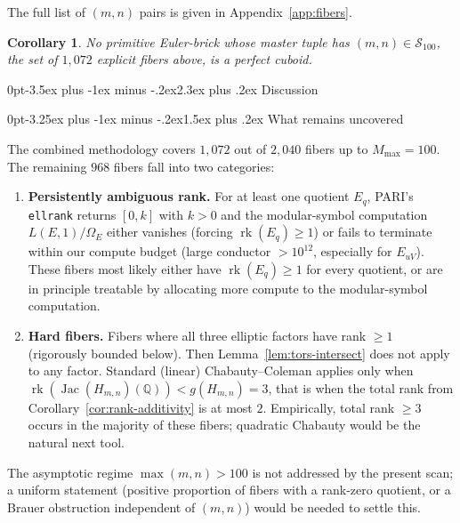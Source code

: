\documentclass[12pt,a4paper,reqno]{amsart}
\makeatletter
\renewcommand{\section}{\@startsection{section}{1}%
  {0pt}{-3.5ex plus -1ex minus -.2ex}{2.3ex plus .2ex}%
  {\normalfont\large\bfseries}}
\renewcommand{\subsection}{\@startsection{subsection}{2}%
  {0pt}{-3.25ex plus -1ex minus -.2ex}{1.5ex plus .2ex}%
  {\normalfont\normalsize\bfseries}}
\theoremstyle{plain}
\newtheorem{corollary}[theorem]{Corollary}
\theoremstyle{definition}
\theoremstyle{remark}
\newcommand{\Q}{\mathbb{Q}}
\newcommand{\HC}{H_{m,n}}
\newcommand{\Jac}{\operatorname{Jac}}
\newcommand{\rk}{\operatorname{rk}}
\makeatother
\begin{document}
The full list of $(m, n)$ pairs is given in Appendix~\ref{app:fibers}.

\begin{corollary}
No primitive Euler-brick whose master tuple has $(m, n) \in \mathcal{S}_{100}$, the set of $1{,}072$ explicit fibers above, is a perfect cuboid.
\end{corollary}

\section{Discussion}
\label{sec:discussion}

\subsection{What remains uncovered}

The combined methodology covers $1{,}072$ out of $2{,}040$ fibers up to $M_{\max} = 100$. The remaining $968$ fibers fall into two categories:

\begin{enumerate}[label=(\alph*)]
\item \textbf{Persistently ambiguous rank.} For at least one quotient $E_q$, PARI's \texttt{ellrank} returns $[0, k]$ with $k > 0$ and the modular-symbol computation $L(E, 1)/\Omega_E$ either vanishes (forcing $\rk(E_q) \ge 1$) or fails to terminate within our compute budget (large conductor $> 10^{12}$, especially for $E_{uV}$). These fibers most likely either have $\rk(E_q) \ge 1$ for every quotient, or are in principle treatable by allocating more compute to the modular-symbol computation.

\item \textbf{Hard fibers.} Fibers where all three elliptic factors have rank $\ge 1$ (rigorously bounded below). Then Lemma~\ref{lem:tors-intersect} does not apply to any factor. Standard (linear) Chabauty--Coleman applies only when $\rk(\Jac(\HC)(\Q)) < g(\HC) = 3$, that is when the total rank from Corollary~\ref{cor:rank-additivity} is at most $2$. Empirically, total rank $\ge 3$ occurs in the majority of these fibers; quadratic Chabauty would be the natural next tool.
\end{enumerate}

The asymptotic regime $\max(m, n) > 100$ is not addressed by the present scan; a uniform statement (positive proportion of fibers with a rank-zero quotient, or a Brauer obstruction independent of $(m, n)$) would be needed to settle this.
\end{document}
